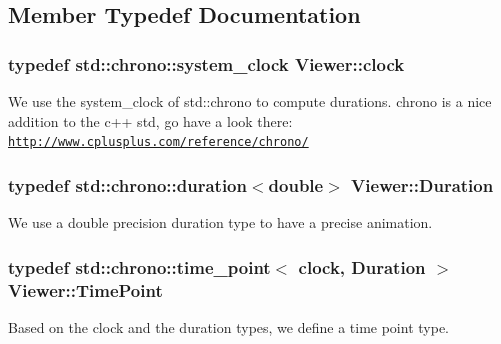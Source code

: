 \subsection{Member Typedef Documentation}
\hypertarget{classViewer_a3b19fa21a19da8b561cac43e47e50277}{
\subsubsection[{clock}]{\setlength{\rightskip}{0pt plus 5cm}typedef std\+::chrono\+::system\+\_\+clock {\bf Viewer\+::clock}}}\label{classViewer_a3b19fa21a19da8b561cac43e47e50277}
We use the system\+\_\+clock of std\+::chrono to compute durations. chrono is a nice addition to the c++ std, go have a look there\+: \href{http://www.cplusplus.com/reference/chrono/}{\tt http\+://www.\+cplusplus.\+com/reference/chrono/} \hypertarget{classViewer_aa36c6a10e0823afb4d570dbd6f0a01a3}{
\subsubsection[{Duration}]{\setlength{\rightskip}{0pt plus 5cm}typedef std\+::chrono\+::duration$<$double$>$ {\bf Viewer\+::\+Duration}}}\label{classViewer_aa36c6a10e0823afb4d570dbd6f0a01a3}
We use a double precision duration type to have a precise animation. \hypertarget{classViewer_ae3f3e7a7694a354a2d374693649000ec}{
\subsubsection[{Time\+Point}]{\setlength{\rightskip}{0pt plus 5cm}typedef std\+::chrono\+::time\+\_\+point$<$ {\bf clock}, {\bf Duration} $>$ {\bf Viewer\+::\+Time\+Point}}}\label{classViewer_ae3f3e7a7694a354a2d374693649000ec}
Based on the clock and the duration types, we define a time point type. 

